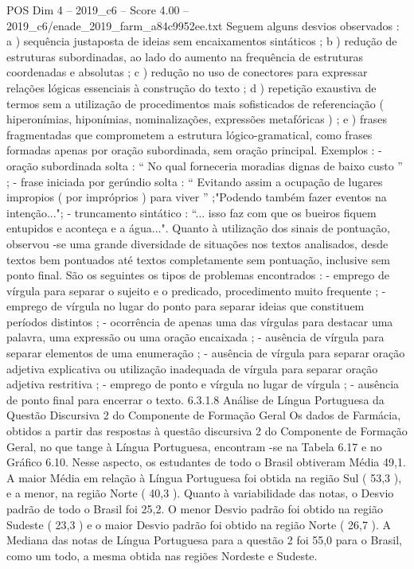 \begin{textsample}{POS Dim 4 – 2019\_c6 – Score 4.00 – 2019\_c6/enade\_2019\_farm\_a84c9952ee.txt}
Seguem alguns desvios observados : a ) sequência justaposta de ideias sem encaixamentos sintáticos ; b ) redução de estruturas subordinadas, ao lado do aumento na frequência de estruturas coordenadas e absolutas ; c ) redução no uso de conectores para expressar relações lógicas essenciais à construção do texto ; d ) repetição exaustiva de termos sem a utilização de procedimentos mais sofisticados de referenciação ( hiperonímias, hiponímias, nominalizações, expressões metafóricas ) ; e ) frases fragmentadas que comprometem a estrutura lógico-gramatical, como frases formadas apenas por oração subordinada, sem oração principal.
Exemplos : - oração subordinada solta : “ No qual forneceria moradias dignas de baixo custo ” ; - frase iniciada por gerúndio solta : “ Evitando assim a ocupação de lugares impropios ( por impróprios ) para viver ” ;"Podendo também fazer eventos na intenção..."; - truncamento sintático : “... isso faz com que os bueiros fiquem entupidos e aconteça e a água...".
Quanto à utilização dos sinais de pontuação, observou -se uma grande diversidade de situações nos textos analisados, desde textos bem pontuados até textos completamente sem pontuação, inclusive sem ponto final.
São os seguintes os tipos de problemas encontrados : - emprego de vírgula para separar o sujeito e o predicado, procedimento muito frequente ; - emprego de vírgula no lugar do ponto para separar ideias que constituem períodos distintos ; - ocorrência de apenas uma das vírgulas para destacar uma palavra, uma expressão ou uma oração encaixada ; - ausência de vírgula para separar elementos de uma enumeração ; - ausência de vírgula para separar oração adjetiva explicativa ou utilização inadequada de vírgula para separar oração adjetiva restritiva ; - emprego de ponto e vírgula no lugar de vírgula ; - ausência de ponto final para encerrar o texto. 6.3.1.8 Análise de Língua Portuguesa da Questão Discursiva 2 do Componente de Formação Geral Os dados de Farmácia, obtidos a partir das respostas à questão discursiva 2 do Componente de Formação Geral, no que tange à Língua Portuguesa, encontram -se na Tabela 6.17 e no Gráfico 6.10.
Nesse aspecto, os estudantes de todo o Brasil obtiveram Média 49,1.
A maior Média em relação à Língua Portuguesa foi obtida na região Sul ( 53,3 ), e a menor, na região Norte ( 40,3 ).
Quanto à variabilidade das notas, o Desvio padrão de todo o Brasil foi 25,2.
O menor Desvio padrão foi obtido na região Sudeste ( 23,3 ) e o maior Desvio padrão foi obtido na região Norte ( 26,7 ).
A Mediana das notas de Língua Portuguesa para a questão 2 foi 55,0 para o Brasil, como um todo, a mesma obtida nas regiões Nordeste e Sudeste.

\end{textsample}
